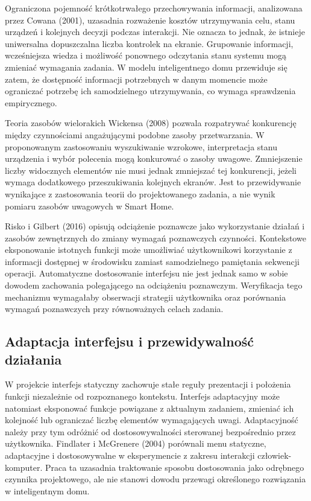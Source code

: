 \documentclass[11pt,a4paper]{article}
\begin{document}
Ograniczona pojemność krótkotrwałego przechowywania informacji, analizowana przez Cowana (2001), uzasadnia rozważenie kosztów utrzymywania celu, stanu urządzeń i kolejnych decyzji podczas interakcji. Nie oznacza to jednak, że istnieje uniwersalna dopuszczalna liczba kontrolek na ekranie. Grupowanie informacji, wcześniejsza wiedza i możliwość ponownego odczytania stanu systemu mogą zmieniać wymagania zadania. W modelu inteligentnego domu przewiduje się zatem, że dostępność informacji potrzebnych w danym momencie może ograniczać potrzebę ich samodzielnego utrzymywania, co wymaga sprawdzenia empirycznego.

Teoria zasobów wielorakich Wickensa (2008) pozwala rozpatrywać konkurencję między czynnościami angażującymi podobne zasoby przetwarzania. W proponowanym zastosowaniu wyszukiwanie wzrokowe, interpretacja stanu urządzenia i wybór polecenia mogą konkurować o zasoby uwagowe. Zmniejszenie liczby widocznych elementów nie musi jednak zmniejszać tej konkurencji, jeżeli wymaga dodatkowego przeszukiwania kolejnych ekranów. Jest to przewidywanie wynikające z zastosowania teorii do projektowanego zadania, a nie wynik pomiaru zasobów uwagowych w Smart Home.

Risko i Gilbert (2016) opisują odciążenie poznawcze jako wykorzystanie działań i zasobów zewnętrznych do zmiany wymagań poznawczych czynności. Kontekstowe eksponowanie istotnych funkcji może umożliwiać użytkownikowi korzystanie z informacji dostępnej w środowisku zamiast samodzielnego pamiętania sekwencji operacji. Automatyczne dostosowanie interfejsu nie jest jednak samo w sobie dowodem zachowania polegającego na odciążeniu poznawczym. Weryfikacja tego mechanizmu wymagałaby obserwacji strategii użytkownika oraz porównania wymagań poznawczych przy równoważnych celach zadania.

\subsection{Adaptacja interfejsu i przewidywalność działania}

W projekcie interfejs statyczny zachowuje stałe reguły prezentacji i położenia funkcji niezależnie od rozpoznanego kontekstu. Interfejs adaptacyjny może natomiast eksponować funkcje powiązane z aktualnym zadaniem, zmieniać ich kolejność lub ograniczać liczbę elementów wymagających uwagi. Adaptacyjność należy przy tym odróżnić od dostosowywalności sterowanej bezpośrednio przez użytkownika. Findlater i McGrenere (2004) porównali menu statyczne, adaptacyjne i dostosowywalne w eksperymencie z zakresu interakcji człowiek-komputer. Praca ta uzasadnia traktowanie sposobu dostosowania jako odrębnego czynnika projektowego, ale nie stanowi dowodu przewagi określonego rozwiązania w inteligentnym domu.
\end{document}
